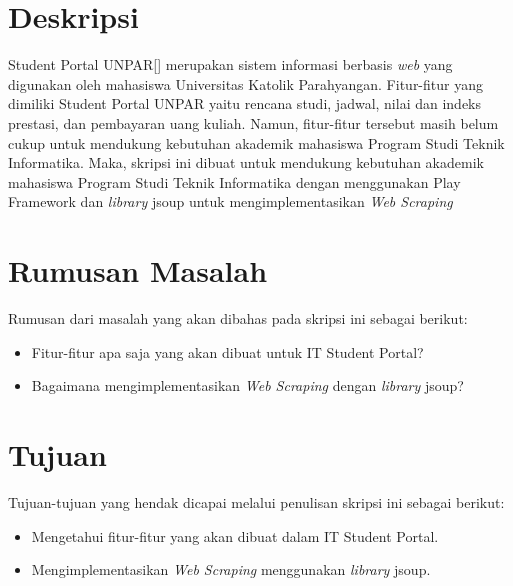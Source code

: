 \documentclass[a4paper,twoside]{article}
\begin{document}
\title{\@judultopik}
\author{\nama \textendash \@npm} 

\newcommand{\nama}{Herfan Heryandi}
\newcommand{\@npm}{2012730012}
\newcommand{\@judultopik}{IT Student Portal: Pemanfaatan \textit{Web Scraping} untuk Kustomisasi Student Portal UNPAR} %
\newcommand{\jumpemb}{1} %
\newcommand{\tanggal}{20/06/2015}
\maketitle


\section{Deskripsi}
Student Portal UNPAR[] merupakan sistem informasi berbasis \textit{web} yang digunakan oleh mahasiswa Universitas Katolik Parahyangan. Fitur-fitur yang dimiliki Student Portal UNPAR yaitu rencana studi, jadwal, nilai dan indeks prestasi, dan pembayaran uang kuliah. Namun, fitur-fitur tersebut masih belum cukup untuk mendukung kebutuhan akademik mahasiswa Program Studi Teknik Informatika. Maka, skripsi ini dibuat untuk mendukung kebutuhan akademik mahasiswa Program Studi Teknik Informatika dengan menggunakan Play Framework dan \textit{library} jsoup untuk mengimplementasikan \textit{Web Scraping}

\section{Rumusan Masalah}
Rumusan dari masalah yang akan dibahas pada skripsi ini sebagai
berikut:
\begin{itemize}
	\item Fitur-fitur apa saja yang akan dibuat untuk IT Student Portal?
	\item Bagaimana mengimplementasikan \textit{Web Scraping} dengan \textit{library} jsoup?
\end{itemize}

\section{Tujuan}
Tujuan-tujuan yang hendak dicapai melalui penulisan skripsi ini sebagai berikut:
\begin{itemize}
	\item	Mengetahui fitur-fitur yang akan dibuat dalam IT Student Portal.
	\item	Mengimplementasikan \textit{Web Scraping} menggunakan \textit{library} jsoup.
\end{itemize}
\end{document}
